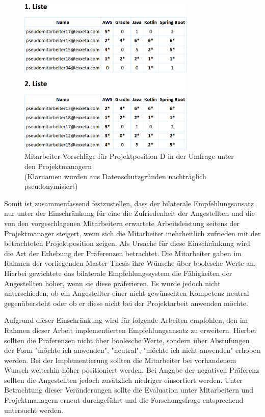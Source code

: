 \begin{figure}[h]
	\centering
	\includegraphics[width=0.75\textwidth]{gfx/projektposition-d.png}
	\caption{Mitarbeiter-Vorschläge für Projektposition D in der Umfrage unter den Projektmanagern\\
	(Klarnamen wurden aus Datenschutzgründen nachträglich pseudonymisiert)}
	\label{fig:diskussion:interpretation:abb2}
\end{figure}

Somit ist zusammenfassend festzustellen, dass der bilaterale Empfehlungsansatz nur unter der Einschränkung für eine die Zufriedenheit der Angestellten und die von den vorgeschlagenen Mitarbeitern erwartete Arbeitsleistung seitens der Projektmanager steigert, wenn sich die Mitarbeiter mehrheitlich zufrieden mit der betrachteten Projektposition zeigen. Als Ursache für diese Einschränkung wird die Art der Erhebung der Präferenzen betrachtet. Die Mitarbeiter gaben im Rahmen der vorliegenden Master-Thesis ihre Wünsche über boolesche Werte an. Hierbei gewichtete das bilaterale Empfehlungssystem die Fähigkeiten der Angestellten höher, wenn sie diese präferieren. Es wurde jedoch nicht unterschieden, ob ein Angestellter einer nicht gewünschten Kompetenz neutral gegenübersteht oder ob er diese nicht bei der Projektarbeit anwenden möchte.

Aufgrund dieser Einschränkung wird für folgende Arbeiten empfohlen, den im Rahmen dieser Arbeit implementierten Empfehlungsansatz zu erweitern. Hierbei sollten die Präferenzen nicht über boolesche Werte, sondern über Abstufungen der Form "möchte ich anwenden", "neutral", "möchte ich nicht anwenden" erhoben werden. Bei der Implementierung sollten die Mitarbeiter bei vorhandenem Wunsch weiterhin höher positioniert werden. Bei Angabe der negativen Präferenz sollten die Angestellten jedoch zusätzlich niedriger einsortiert werden. Unter Betrachtung dieser Veränderungen sollte die Evaluation unter Mitarbeitern und Projektmanagern erneut durchgeführt und die Forschungsfrage entsprechend untersucht werden.


